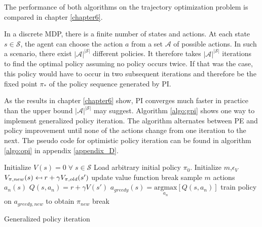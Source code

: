 The performance of both algorithms on the trajectory optimization problem is compared in chapter \ref{chapter6}. \bigbreak

In a discrete MDP, there is a finite number of states and actions. At each state $s \in \mathcal{S}$, the agent can choose the action $a$ from a set $\mathcal{A}$ of possible actions. In such a scenario, there exist $|\mathcal{A}|^{|\mathcal{S}|}$ different policies. It therefore takes $|\mathcal{A}|^{|\mathcal{S}|}$ iterations to find the optimal policy assuming no policy occurs twice. If that was the case, this policy would have to occur in two subsequent iterations and therefore be the fixed point $\pi_*$ of the policy sequence generated by PI.

As the results in chapter \ref{chapter6} show, PI converges much faster in practice than the upper bound $|\mathcal{A}|^{|\mathcal{S}|}$ may suggest. Algorithm \ref{algo:gpi} shows one way to implement generalized policy iteration. The algorithm alternates between PE and policy improvement until none of the actions change from one iteration to the next. The pseudo code for optimistic policy iteration can be found in algorithm \ref{algo:opi} in appendix \ref{appendix_D}.

\begin{algorithm}[hbt]
	\begin{algorithmic}[0] %
		\State Initialize $V(s) = 0 \; \forall \; s \in \mathcal{S}$
		\State Load arbitrary initial policy $\pi_0$.
		\State Initialize $m$,\;$\epsilon_V$
		\State $V_{\pi,new}(s) \mathrel{\reflectbox{\ensuremath{\mapsto}}} r+\gamma V_ {\pi,old}(s')$
		\EndFor
		\State update value function
		\State break
		\EndIf
		\EndWhile
		\EndFunction
		\State sample $m$ actions $a_n(s)$
		\State $Q(s,a_n) = r + \gamma V(s')$
		\EndFor
		\State $a_{greedy}(s)=\underset{a_n}{\text{argmax}}[Q(s,a_n)]$
		\EndFor
		\EndFunction
		\State
		\State train policy on $a_{greedy,new}$ to obtain $\pi_{new}$
		\State break
		\EndIf
		
		\EndWhile
		\State
		\EndFunction
	\end{algorithmic}
	\caption{Generalized policy iteration}
	\label{algo:gpi}
\end{algorithm}

